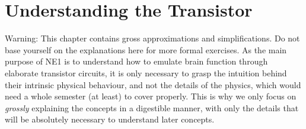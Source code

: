 \newpage
\section{Understanding the Transistor}
Warning: This chapter contains gross approximations and simplifications. Do not base yourself on the explanations here for more formal exercises. As the main purpose of NE1 is to understand how to emulate brain function through elaborate transistor circuits, it is only necessary to grasp the intuition behind their intrinsic physical behaviour, and not the details of the physics, which would need a whole semester (at least) to cover properly. This is why we only focus on \textit{grossly} explaining the concepts in a digestible manner, with only the details that will be absolutely necessary to understand later concepts. 








